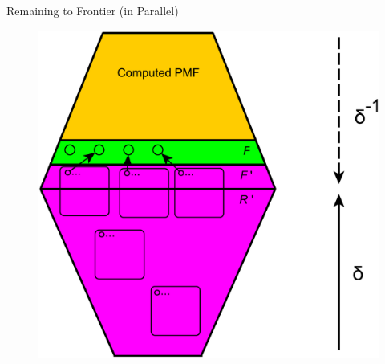 \documentclass{beamer}
\begin{document}
\begin{frame}{Remaining to Frontier (in Parallel)}
	\begin{figure}
		\includegraphics[height=0.8\textheight]{figs/r2f_parallel.pdf}
	\end{figure}
\end{frame}
%
%	
%	
%
\end{document}
